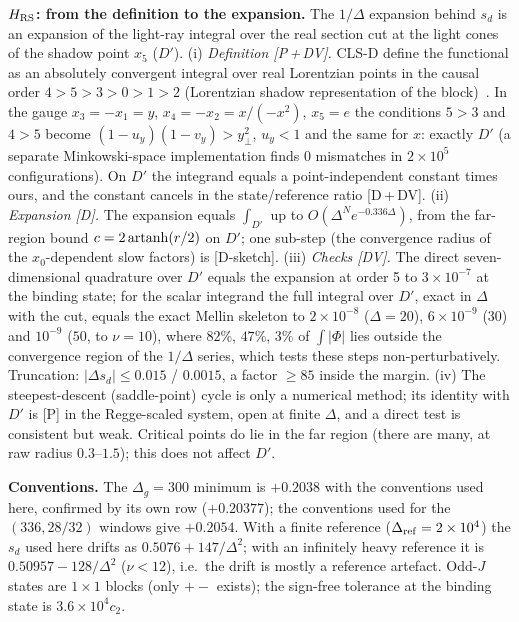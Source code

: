 \documentclass[aps,prl,onecolumn,superscriptaddress,nofootinbib]{revtex4-2}
\begin{document}
\textbf{$H_{\rm RS}$: from the definition to the expansion.} The $1/\Delta$ expansion behind $s_d$ is an expansion of
the light-ray integral over the real section cut at the light cones of the shadow point $x_5$ ($D'$). (i)
\emph{Definition [P\,+\,DV].} CLS-D define the functional as an absolutely convergent integral over real
Lorentzian points in the causal order $4>5>3>0>1>2$ (Lorentzian shadow representation of the
block)~\cite{CLSD}. In the gauge $x_3=-x_1=y$, $x_4=-x_2=x/(-x^2)$, $x_5=e$ the conditions $5>3$ and $4>5$ become
$(1-u_y)(1-v_y)>y_\perp^2$, $u_y<1$ and the same for $x$: exactly $D'$ (a separate Minkowski-space
implementation finds 0 mismatches in $2\times10^5$ configurations). On $D'$ the integrand equals a
point-independent constant times ours, and the constant cancels in the state/reference ratio [D\,+\,DV]. (ii)
\emph{Expansion [D].} The expansion equals $\int_{D'}$ up to $O(\Delta^Ne^{-0.336\Delta})$, from the far-region bound
$c=2\,{\rm artanh}(r/2)$ on $D'$; one sub-step (the convergence radius of the $x_0$-dependent slow factors) is
[D-sketch]. (iii) \emph{Checks [DV].} The direct seven-dimensional quadrature over $D'$ equals the expansion at
order 5 to $3\times10^{-7}$ at the binding state; for the scalar integrand the full integral over $D'$, exact in
$\Delta$ with the cut, equals the exact Mellin skeleton to $2\times10^{-8}$ ($\Delta=20$), $6\times10^{-9}$ ($30$) and
$10^{-9}$ ($50$, to $\nu=10$), where $82\%$, $47\%$, $3\%$ of $\int|\Phi|$ lies outside the convergence region of the
$1/\Delta$ series, which tests these steps non-perturbatively. Truncation: $|\Delta s_d|\le0.015$ / $0.0015$, a factor
$\ge85$ inside the margin. (iv) The steepest-descent (saddle-point) cycle is only a numerical method; its
identity with $D'$ is [P] in the Regge-scaled system, open at finite $\Delta$, and a direct test is consistent
but weak. Critical points do lie in the far region (there are many,
at raw radius $0.3$--$1.5$); this does not affect $D'$.

\textbf{Conventions.} The $\Delta_g=300$ minimum is $+0.2038$ with the conventions used here, confirmed by its own
row ($+0.20377$); the conventions used for the $(336,28/32)$ windows give $+0.2054$. With a finite reference
($\Delta_{\rm ref}=2\times10^4$) the $s_d$ used here drifts as $0.5076+147/\Delta^2$; with an infinitely heavy
reference it is $0.50957-128/\Delta^2$ ($\nu<12$), i.e.\ the drift is mostly a reference artefact. Odd-$J$ states are $1\times1$ blocks (only $+-$ exists); the sign-free tolerance at the binding state is $3.6\times10^4c_2$.
\end{document}
